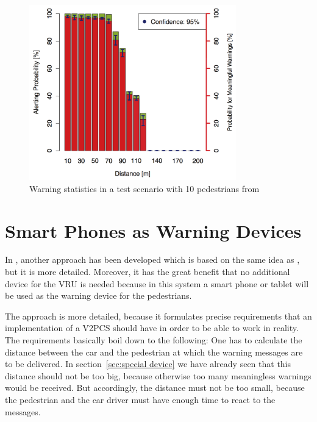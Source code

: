\documentclass[]{ccs-thesis}
\begin{document}
\begin{figure}[h]
	\centering
	\includegraphics[width=0.8\textwidth]{figures/3_chart}
	\caption{Warning statistics in a test scenario with 10 pedestrians from \cite{v2pprotection}}%
	\label{fig:chart2}%
\end{figure}


\section{Smart Phones as Warning Devices}\label{sec:smartphone}

In \cite{v2pcomm}, another approach has been developed which is based on the same idea as \cite{v2pprotection}, but it is more detailed. Moreover, it has the great benefit that no additional device for the \ac{VRU} is needed because in this system a smart phone or tablet will be used as the warning device for the pedestrians.

The approach is more detailed, because it formulates precise requirements that an implementation of a \ac{V2PCS} should have in order to be able to work in reality. The  requirements basically boil down to the following: One has to calculate the distance between the car and the pedestrian at which the warning messages are to be delivered. In section~\ref{sec:special device} we have already seen that this distance should not be too big, because otherwise too many meaningless warnings would be received. But accordingly, the distance must not be too small, because the pedestrian and the car driver must have enough time to react to the messages.
\end{document}
